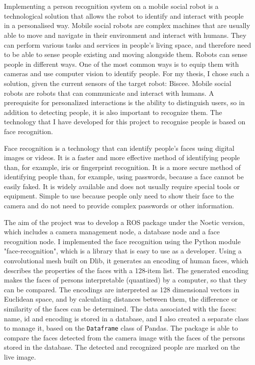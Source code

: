 \chapter*{\summary}

\selectforeignlanguage %

Implementing a person recognition system on a mobile social robot is a technological solution that allows the robot to identify and interact with people in a personalised way. Mobile social robots are complex machines that are usually able to move and navigate in their environment and interact with humans. They can perform various tasks and services in people's living space, and therefore need to be able to sense people existing and moving alongside them. Robots can sense people in different ways. One of the most common ways is to equip them with cameras and use computer vision to identify people. For my thesis, I chose such a solution, given the current sensors of the target robot: Biscee. Mobile social robots are robots that can communicate and interact with humans. A prerequisite for personalized interactions is the ability to distinguish users, so in addition to detecting people, it is also important to recognize them. The technology that I have developed for this project to recognise people is based on face recognition.

Face recognition is a technology that can identify people's faces using digital images or videos. It is a faster and more effective method of identifying people than, for example, iris or fingerprint recognition. It is a more secure method of identifying people than, for example, using passwords, because a face cannot be easily faked. It is widely available and does not usually require special tools or equipment. Simple to use because people only need to show their face to the camera and do not need to provide complex passwords or other information.

The aim of the project was to develop a ROS package under the Noetic version, which includes a camera management node, a database node and a face recognition node. I implemented the face recognition using the Python module "face-recognition", which is a library that is easy to use as a developer. Using a convolutional mesh built on Dlib, it generates an encoding of human faces, which describes the properties of the faces with a 128-item list. The generated encoding makes the faces of persons interpretable (quantized) by a computer, so that they can be compared. The encodings are interpreted as 128 dimensional vectors in Euclidean space, and by calculating distances between them, the difference or similarity of the faces can be determined. The data associated with the faces: name, id and encoding is stored in a database, and I also created a separate class to manage it, based on the \verb|Dataframe| class of Pandas. The package is able to compare the faces detected from the camera image with the faces of the persons stored in the database. The detected and recognized people are marked on the live image.



